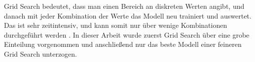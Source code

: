 Grid Search bedeutet, dass man einen Bereich an diskreten Werten angibt, und danach mit jeder Kombination der Werte das Modell neu trainiert und auswertet.
Das ist sehr zeitintensiv, und kann somit nur \"uber wenige Kombinationen durchgef\"uhrt werden \cite[Seiten 76 bis 78]{handson}. In dieser Arbeit wurde zuerst Grid Search \"uber eine grobe Einteilung
vorgenommen und anschlie{\ss}end nur das beste Modell einer feineren Grid Search unterzogen. \\




